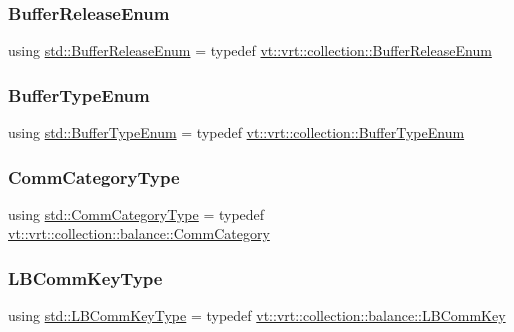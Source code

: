 \subsubsection{\texorpdfstring{Buffer\+Release\+Enum}{BufferReleaseEnum}}
{\footnotesize\ttfamily using \hyperlink{namespacevt_1_1vrt_1_1collection_a2545006e681bacc1f00be9d5d6bdc8fa}{std\+::\+Buffer\+Release\+Enum} = typedef \hyperlink{namespacevt_1_1vrt_1_1collection_a2545006e681bacc1f00be9d5d6bdc8fa}{vt\+::vrt\+::collection\+::\+Buffer\+Release\+Enum}}

\mbox{\label{namespacestd_ab5492c80007bc5a00cc49a954c809d6f}} 
\subsubsection{\texorpdfstring{Buffer\+Type\+Enum}{BufferTypeEnum}}
{\footnotesize\ttfamily using \hyperlink{namespacevt_1_1vrt_1_1collection_a1b1b082e2ff4e9e5d1b7227acd78db3f}{std\+::\+Buffer\+Type\+Enum} = typedef \hyperlink{namespacevt_1_1vrt_1_1collection_a1b1b082e2ff4e9e5d1b7227acd78db3f}{vt\+::vrt\+::collection\+::\+Buffer\+Type\+Enum}}

\mbox{\label{namespacestd_a4dd27d43e4725feae37124932561af56}} 
\subsubsection{\texorpdfstring{Comm\+Category\+Type}{CommCategoryType}}
{\footnotesize\ttfamily using \hyperlink{namespacevt_1_1vrt_1_1collection_1_1balance_a9cc6c6884ca0416dae824e9204093c57}{std\+::\+Comm\+Category\+Type} = typedef \hyperlink{namespacevt_1_1vrt_1_1collection_1_1balance_a9cc6c6884ca0416dae824e9204093c57}{vt\+::vrt\+::collection\+::balance\+::\+Comm\+Category}}

\mbox{\label{namespacestd_a3a6802ab62d3595b44a8463f8e654c31}} 
\subsubsection{\texorpdfstring{L\+B\+Comm\+Key\+Type}{LBCommKeyType}}
{\footnotesize\ttfamily using \hyperlink{namespacestd_a3a6802ab62d3595b44a8463f8e654c31}{std\+::\+L\+B\+Comm\+Key\+Type} = typedef \hyperlink{structvt_1_1vrt_1_1collection_1_1balance_1_1_l_b_comm_key}{vt\+::vrt\+::collection\+::balance\+::\+L\+B\+Comm\+Key}}

